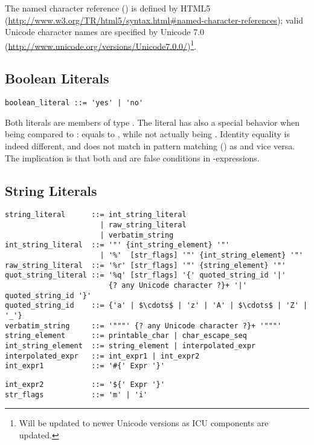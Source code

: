 The named character reference () is defined by HTML5 (\url{http://www.w3.org/TR/html5/syntax.html#named-character-references}); valid Unicode character names are specified by Unicode 7.0 (\url{http://www.unicode.org/versions/Unicode7.0.0/})\footnote{Will be updated to newer Unicode versions as ICU components are updated.}. 





\subsection{Boolean Literals}
\label{sec:booleanliterals}

\syntax\begin{lstlisting}
boolean_literal ::= 'yes' | 'no'
\end{lstlisting}

Both literals are members of type \lstinline@Boolean@. The \lstinline@no@ literal has also a special behavior when being compared to \lstinline@nil@: \lstinline@no@ equals to \lstinline@nil@, while not actually being \lstinline@nil@. Identity equality is indeed different, and  does not match in pattern matching () as  and vice versa. The implication is that both \lstinline@nil@ and \lstinline@no@ are false conditions in \lstinline@if@-expressions. 





\subsection{String Literals}
\label{sec:stringliterals}

\syntax\begin{lstlisting}
string_literal      ::= int_string_literal
                      | raw_string_literal
                      | verbatim_string
int_string_literal  ::= '"' {int_string_element} '"'
                      | '%'  [str_flags] '"' {int_string_element} '"'
raw_string_literal  ::= '%r' [str_flags] '"' {string_element} '"'
quot_string_literal ::= '%q' [str_flags] '{' quoted_string_id '|'
                        {? any Unicode character ?}+ '|' quoted_string_id '}'
quoted_string_id    ::= {'a' | $\cdots$ | 'z' | 'A' | $\cdots$ | 'Z' | '_'}
verbatim_string     ::= '"""' {? any Unicode character ?}+ '"""'
string_element      ::= printable_char | char_escape_seq
int_string_element  ::= string_element | interpolated_expr
interpolated_expr   ::= int_expr1 | int_expr2
int_expr1           ::= '#{' Expr '}'
\end{lstlisting}
\begin{lstlisting}[mathescape=false]
int_expr2           ::= '${' Expr '}'
str_flags           ::= 'm' | 'i'
\end{lstlisting}

